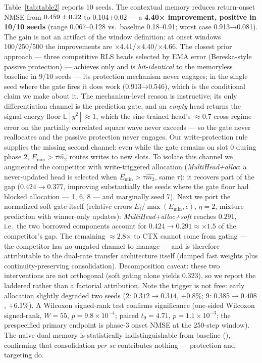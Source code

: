 \documentclass[11pt]{article}
\begin{document}
Table~\ref{tab:table2} reports 10 seeds. The contextual memory reduces return-onset
NMSE from \(0.459\pm0.22\) to 0.104\(\pm0.02\) --- a \textbf{4.40× improvement,
positive in 10/10 seeds} (range 0.067--0.128 vs.~baseline 0.18--0.91;
worst case 0.913→0.081). The gain is not an artifact of the window
definition: at onset windows 100/250/500 the improvements are
×4.41/×4.40/×4.66. The closest prior approach --- three competitive
RLS heads selected by EMA error (Bereska-style passive protection) ---
achieves only \mhOnset{} and is \emph{bit-identical} to the memoryless baseline
in 9/10 seeds --- its protection mechanism never engages; in the single
seed where the gate fires it does work (0.913→0.546), which is the
conditional claim we make about it. The mechanism-level reason is
instructive: its only differentiation channel is the prediction gate,
and an \emph{empty} head returns the signal-energy floor
\(\mathbb{E}[y^2]\approx1\), which the sine-trained head's
\(\approx 0.7\) cross-regime error on the partially correlated square
wave never exceeds --- so the gate never reallocates and the passive
protection never engages. Our write-protection rule supplies the
missing second channel: even while the gate remains on slot 0 during
phase 2, \(E_{\min}>\tau\widehat{m_2}\) routes writes to new slots.
To isolate this channel we augmented the competitor with
write-triggered allocation (\emph{MultiHead+alloc}: a never-updated head
is selected when \(E_{\min}>\tau\widehat{m_2}\), same \(\tau\)): it
recovers part of the gap (\(0.424\to0.377\), improving substantially
the seeds where the gate floor had blocked allocation --- 1, 6, 8 ---
and marginally seed 7).
Next we port the normalized soft gate itself (relative errors
\(E_i/\max(E_{\min},\epsilon)\), \(\eta{=}2\), mixture prediction with
winner-only updates): \emph{MultiHead+alloc+soft} reaches \(0.291\),
i.e.~the two borrowed components account for
\(0.424\to0.291\approx\times1.5\) of the competitor's gap. The
remaining \(\approx 2.8\)× to CTX cannot come from gating --- the
competitor has no ungated channel to manage --- and is therefore
attributable to the dual-rate transfer architecture itself
(damped fast weights plus continuity-preserving consolidation).
Decomposition caveat: these two interventions are not orthogonal
(soft gating alone yields 0.323), so we report the laddered
rather than a factorial attribution. Note the trigger is not free:
early allocation slightly degraded two seeds
(2: \(0.312\to0.314\), +0.8\%; 9: 0.385\(\to0.408\), +6.1\%). A Wilcoxon signed-rank test confirms
significance (one-sided Wilcoxon signed-rank, \(W{=}55\),
\(p{=}9.8\times10^{-4}\); paired \(t_{9}{=}4.71\), \(p{=}1.1\times10^{-3}\);
the prespecified primary endpoint is phase-3 onset NMSE at the 250-step
window). The naive dual memory is
statistically indistinguishable from baseline (\naiveOnset), confirming that
consolidation \emph{per se} contributes nothing --- protection and targeting do.
\end{document}
